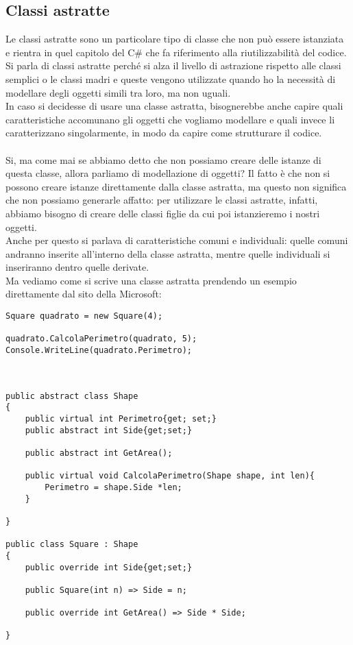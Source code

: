 \documentclass[]{article}
\begin{document}
\subsection{Classi astratte}
Le classi astratte sono un particolare tipo di classe che non può essere istanziata e rientra in quel capitolo del
C\# che fa riferimento alla riutilizzabilità del codice. \\
Si parla di classi astratte perché si alza il livello di astrazione rispetto alle classi semplici o le classi madri e queste vengono utilizzate quando ho la necessità di modellare degli oggetti simili tra loro, ma non uguali. \\
In caso si decidesse di usare una classe astratta, bisognerebbe anche capire quali caratteristiche accomunano gli oggetti che vogliamo modellare e quali invece li caratterizzano singolarmente, in modo da capire come strutturare il codice. \\ \\
Si, ma come mai se abbiamo detto che non possiamo creare delle istanze di questa classe, allora parliamo di modellazione
di oggetti? Il fatto è che non si possono creare istanze direttamente dalla classe astratta, ma questo non significa che
non possiamo generarle affatto: per utilizzare le classi astratte, infatti, abbiamo bisogno di creare delle classi figlie da cui poi istanzieremo i nostri oggetti. \\
Anche per questo si parlava di caratteristiche comuni e individuali: quelle comuni andranno inserite all'interno della
classe astratta, mentre quelle individuali si inseriranno dentro quelle derivate. \\
Ma vediamo come si scrive una classe astratta prendendo un esempio direttamente dal sito della Microsoft:
\begin{verbatim}
Square quadrato = new Square(4);

quadrato.CalcolaPerimetro(quadrato, 5);
Console.WriteLine(quadrato.Perimetro);



public abstract class Shape
{
	public virtual int Perimetro{get; set;}
	public abstract int Side{get;set;}
	
	public abstract int GetArea();
	
	public virtual void CalcolaPerimetro(Shape shape, int len){
		Perimetro = shape.Side *len;
	} 
	
}

public class Square : Shape
{
	public override int Side{get;set;}
	
	public Square(int n) => Side = n;
	
	public override int GetArea() => Side * Side;
	
}
\end{verbatim}
\end{document}
